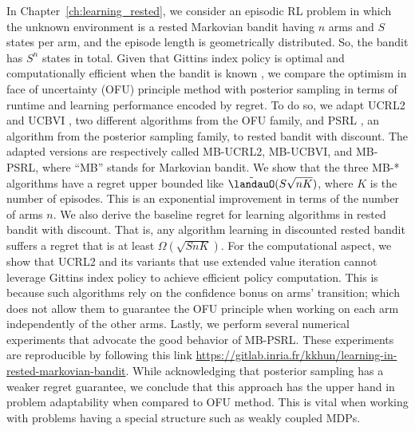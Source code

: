 In Chapter~\ref{ch:learning_rested}, we consider an episodic RL problem in which the unknown environment is a rested Markovian bandit having $n$ arms and $S$ states per arm, and the episode length is geometrically distributed.
So, the bandit has $S^n$ states in total.
Given that Gittins index policy is optimal and computationally efficient when the bandit is known \cite{gittins1979bandit}, we compare the optimism in face of uncertainty (OFU) principle method with posterior sampling in terms of runtime and learning performance encoded by regret.
To do so, we adapt UCRL2 \cite{jaksch2010near} and UCBVI \cite{azar2017minimax}, two different algorithms from the OFU family, and PSRL \cite{osband2013more}, an algorithm from the posterior sampling family, to rested bandit with discount.
The adapted versions are respectively called MB-UCRL2, MB-UCBVI, and MB-PSRL, where ``MB'' stands for Markovian bandit.
We show that the three MB-* algorithms have a regret upper bounded like $\tilde{\landauO}(S\sqrt{nK})$, where $K$ is the number of episodes.
This is an exponential improvement in terms of the number of arms $n$.
We also derive the baseline regret for learning algorithms in rested bandit with discount.
That is, any algorithm learning in discounted rested bandit suffers a regret that is at least $\Omega(\sqrt{SnK})$.
For the computational aspect, we show that UCRL2 and its variants that use extended value iteration \cite{jaksch2010near} cannot leverage Gittins index policy to achieve efficient policy computation.
This is because such algorithms rely on the confidence bonus on arms' transition; which does not allow them to guarantee the OFU principle when working on each arm independently of the other arms.
Lastly, we perform several numerical experiments that advocate the good behavior of MB-PSRL.
These experiments are reproducible by following this link \url{https://gitlab.inria.fr/kkhun/learning-in-rested-markovian-bandit}.
While acknowledging that posterior sampling has a weaker regret guarantee, we conclude that this approach has the upper hand in problem adaptability when compared to OFU method.
This is vital when working with problems having a special structure such as weakly coupled MDPs.

